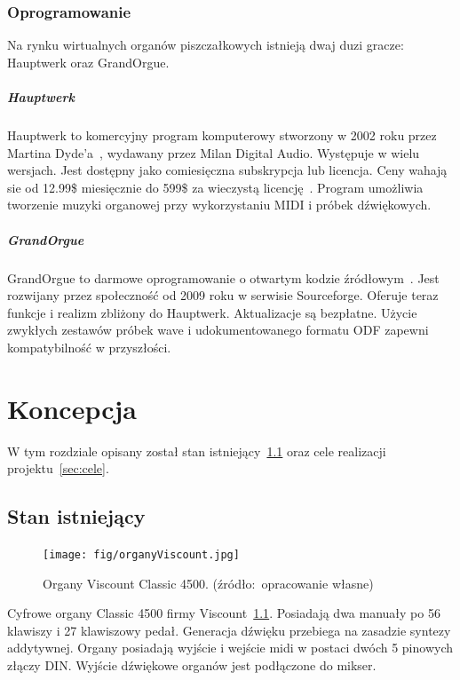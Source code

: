 \documentclass[11pt]{report}
\begin{document}
    \subsection{Oprogramowanie}

    Na rynku wirtualnych organów piszczałkowych istnieją dwaj duzi gracze: Hauptwerk oraz GrandOrgue.

    \paragraph{Hauptwerk}
    Hauptwerk to komercyjny program komputerowy stworzony w 2002 roku przez Martina Dyde'a~\cite{13115512220180101}, wydawany przez Milan Digital Audio.
    Występuje w wielu wersjach.
    Jest dostępny jako comiesięczna subskrypcja lub licencja.
    Ceny wahają sie od 12.99\$ miesięcznie do 599\$ za wieczystą licencję~\cite{hauptwerk}.
    Program umożliwia tworzenie muzyki organowej przy wykorzystaniu MIDI i próbek dźwiękowych.

    \paragraph{GrandOrgue}
    GrandOrgue to darmowe oprogramowanie o otwartym kodzie źródłowym~\cite{grandorgue}.
    Jest rozwijany przez społeczność od 2009 roku w serwisie Sourceforge.
    Oferuje teraz funkcje i realizm zbliżony do Hauptwerk.
    Aktualizacje są bezpłatne.
    Użycie zwykłych zestawów próbek wave i udokumentowanego formatu ODF zapewni kompatybilność w przyszłości.


    \chapter{Koncepcja}
    W tym rozdziale opisany został stan istniejący~\ref{sec:stan-istniejący} oraz cele realizacji projektu~\ref{sec:cele}.


    \section{Stan istniejący}\label{sec:stan-istniejący}

    \begin{figure}[!ht]
        \centering
        \texttt{[image: fig/organyViscount.jpg]}
        \caption{Organy Viscount Classic 4500. (źródło:~opracowanie własne)}
        \label{fig:organyViscount}
    \end{figure}

    Cyfrowe organy Classic 4500 firmy Viscount~\ref{fig:organyViscount}.
    Posiadają dwa manuały po 56 klawiszy i 27 klawiszowy pedał.
    Generacja dźwięku przebiega na zasadzie syntezy addytywnej.
    Organy posiadają wyjście i wejście midi w postaci dwóch 5 pinowych złączy DIN.
    Wyjście dźwiękowe organów jest podłączone do mikser.
\end{document}
